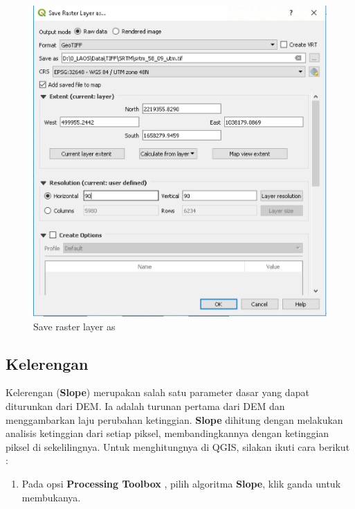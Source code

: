 \documentclass[]{book}
\providecommand{\tightlist}{%
  \setlength{\itemsep}{0pt}\setlength{\parskip}{0pt}}
\begin{document}
\begin{figure}

{\centering \includegraphics[width=0.7\linewidth]{images/04/fig71} 

}

\caption{Save raster layer as}\label{fig:fig1471}
\end{figure}

\hypertarget{kelerengan}{%
\subsection{Kelerengan}\label{kelerengan}}

Kelerengan (\textbf{Slope}) merupakan salah satu parameter dasar yang dapat diturunkan dari DEM.
Ia adalah turunan pertama dari DEM dan menggambarkan laju perubahan ketinggian. \textbf{Slope} dihitung dengan melakukan analisis ketinggian dari setiap piksel, membandingkannya dengan ketinggian piksel di sekelilingnya. Untuk menghitungnya di QGIS, silakan ikuti cara berikut :

\begin{enumerate}
\def\labelenumi{\arabic{enumi}.}
\tightlist
\item
  Pada opsi \textbf{Processing Toolbox} , pilih algoritma \textbf{Slope}, klik ganda untuk membukanya.
\end{enumerate}
\end{document}
